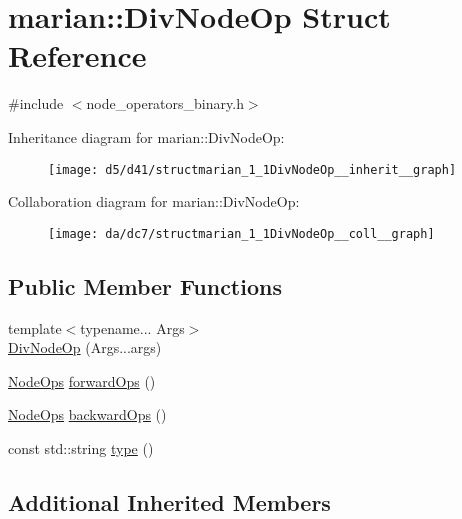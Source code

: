 \hypertarget{structmarian_1_1DivNodeOp}{}\section{marian\+:\+:Div\+Node\+Op Struct Reference}
\label{structmarian_1_1DivNodeOp}


{\ttfamily \#include $<$node\+\_\+operators\+\_\+binary.\+h$>$}



Inheritance diagram for marian\+:\+:Div\+Node\+Op\+:
\nopagebreak
\begin{figure}[H]
\begin{center}
\leavevmode
\texttt{[image: d5/d41/structmarian\_1\_1DivNodeOp\_\_inherit\_\_graph]}
\end{center}
\end{figure}


Collaboration diagram for marian\+:\+:Div\+Node\+Op\+:
\nopagebreak
\begin{figure}[H]
\begin{center}
\leavevmode
\texttt{[image: da/dc7/structmarian\_1\_1DivNodeOp\_\_coll\_\_graph]}
\end{center}
\end{figure}
\subsection*{Public Member Functions}
\begin{DoxyCompactItemize}
\item 
{\footnotesize template$<$typename... Args$>$ }\\\hyperlink{structmarian_1_1DivNodeOp_a4f2cca4b481a2bbeed2ae95cb1949891}{Div\+Node\+Op} (Args...\+args)
\item 
\hyperlink{namespacemarian_a4956376218cc236016c20bc4071470da}{Node\+Ops} \hyperlink{structmarian_1_1DivNodeOp_aa55dcc191fb80a22cbcc60eb08b36b05}{forward\+Ops} ()
\item 
\hyperlink{namespacemarian_a4956376218cc236016c20bc4071470da}{Node\+Ops} \hyperlink{structmarian_1_1DivNodeOp_affd4ce9819f516cb1ea37786ffd8815a}{backward\+Ops} ()
\item 
const std\+::string \hyperlink{structmarian_1_1DivNodeOp_ad744731ea15436e917b4d109a639bcd3}{type} ()
\end{DoxyCompactItemize}
\subsection*{Additional Inherited Members}


